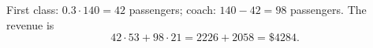 First class: $0.3\cdot140=42$ passengers; coach: $140-42=98$ passengers. The revenue is
\[42\cdot53+98\cdot21=2226+2058=\boxed{\$4284}.\]
